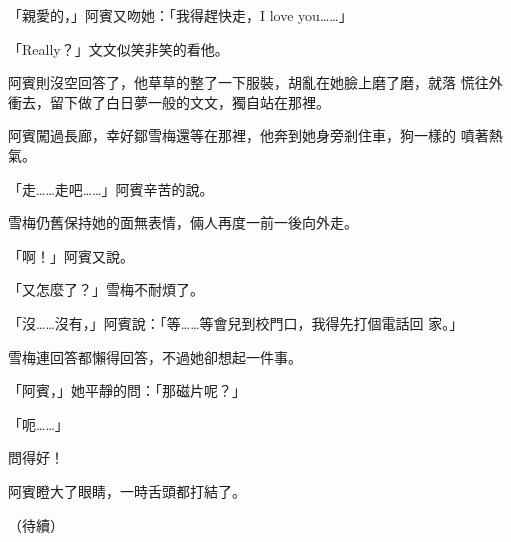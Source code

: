「親愛的，」阿賓又吻她：「我得趕快走，I love you……」

「Really？」文文似笑非笑的看他。

阿賓則沒空回答了，他草草的整了一下服裝，胡亂在她臉上磨了磨，就落
慌往外衝去，留下做了白日夢一般的文文，獨自站在那裡。

阿賓闖過長廊，幸好鄒雪梅還等在那裡，他奔到她身旁剎住車，狗一樣的
噴著熱氣。

「走……走吧……」阿賓辛苦的說。

雪梅仍舊保持她的面無表情，倆人再度一前一後向外走。

「啊！」阿賓又說。

「又怎麼了？」雪梅不耐煩了。

「沒……沒有，」阿賓說：「等……等會兒到校門口，我得先打個電話回
家。」

雪梅連回答都懶得回答，不過她卻想起一件事。

「阿賓，」她平靜的問：「那磁片呢？」

「呃……」

問得好！

阿賓瞪大了眼睛，一時舌頭都打結了。

（待續）










